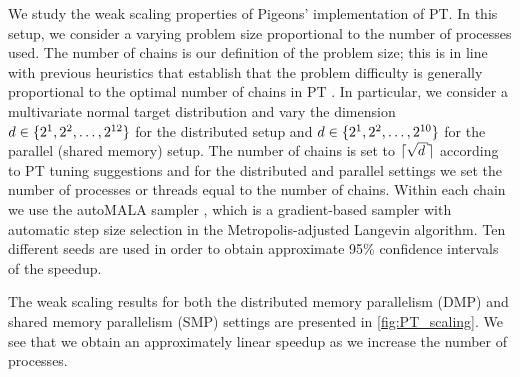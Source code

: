We study the weak scaling properties of Pigeons' implementation of PT.
In this setup, we consider a varying problem size proportional to the number of processes used. 
The number of chains is our definition of the problem size; 
this is in line with previous heuristics that establish that the problem 
difficulty is generally proportional to the optimal number of chains in PT \cite{syed2021nrpt}.
In particular, we consider a multivariate normal target distribution 
and vary the dimension $d \in \cbra{2^1, 2^2, \ldots, 2^{12}}$ for the distributed setup and 
$d \in \cbra{2^1, 2^2, \ldots, 2^{10}}$ for the parallel (shared memory) setup. 
The number of chains is set to $\ceil{\sqrt{d}}$ according to PT tuning suggestions \cite{syed2021nrpt} 
and for the distributed and parallel settings we set the number of processes or threads equal 
to the number of chains.
Within each chain we use the autoMALA sampler \cite{biron2024automala}, which is a 
gradient-based sampler with automatic step size selection in the Metropolis-adjusted Langevin algorithm.
Ten different seeds are used in order to obtain approximate 95\% confidence intervals of 
the speedup.

\medskip
The weak scaling results for both the distributed memory parallelism (DMP) and 
shared memory parallelism (SMP) settings are presented in \cref{fig:PT_scaling}. 
We see that we obtain an approximately linear speedup as we increase the number of processes. 

